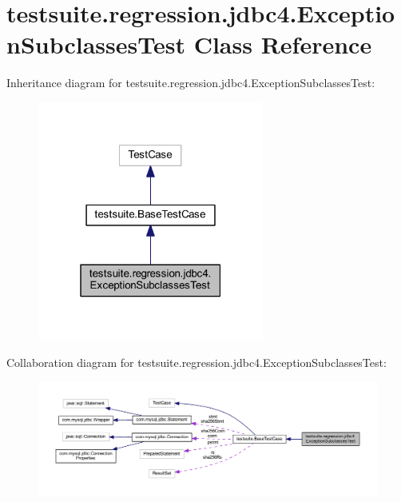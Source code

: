 \hypertarget{classtestsuite_1_1regression_1_1jdbc4_1_1_exception_subclasses_test}{}\section{testsuite.\+regression.\+jdbc4.\+Exception\+Subclasses\+Test Class Reference}
\label{classtestsuite_1_1regression_1_1jdbc4_1_1_exception_subclasses_test}


Inheritance diagram for testsuite.\+regression.\+jdbc4.\+Exception\+Subclasses\+Test\+:
\nopagebreak
\begin{figure}[H]
\begin{center}
\leavevmode
\includegraphics[width=211pt]{classtestsuite_1_1regression_1_1jdbc4_1_1_exception_subclasses_test__inherit__graph}
\end{center}
\end{figure}


Collaboration diagram for testsuite.\+regression.\+jdbc4.\+Exception\+Subclasses\+Test\+:
\nopagebreak
\begin{figure}[H]
\begin{center}
\leavevmode
\includegraphics[width=350pt]{classtestsuite_1_1regression_1_1jdbc4_1_1_exception_subclasses_test__coll__graph}
\end{center}
\end{figure}
